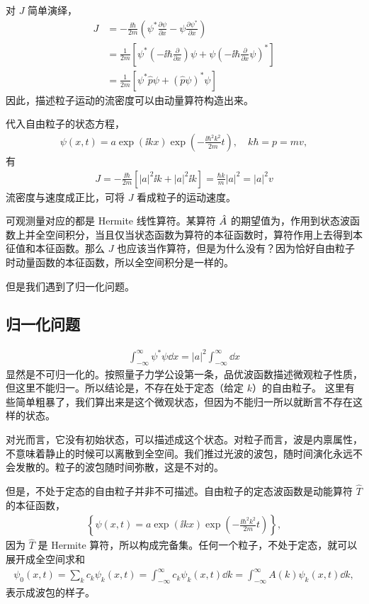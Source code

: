 对 $J$ 简单演绎，
\begin{align}
    J &= -\frac{\ii\hbar}{2m} \left( \psi^* \frac{\partial \psi}{\partial x} - \psi \frac{\partial \psi^*}{\partial x}\right) \\
    &= \frac{1}{2m} \left[
        \psi^* \left(-\ii\hbar\frac{\partial}{\partial x}\right) \psi +
        \psi \left(-\ii\hbar\frac{\partial}{\partial x} \psi\right)^*
    \right] \\
    &= \frac1{2m} \left[\psi^* \hat p \psi + (\hat p\psi)^* \psi\right]
\end{align}
因此，描述粒子运动的流密度可以由动量算符构造出来。

代入自由粒子的状态方程，
\begin{eqnarray}
    \psi(x,t) = a \exp (\ii k x) \exp \left( - \frac{\ii\hbar^2k^2}{2m}t\right), \quad k\hbar = p = mv,
\end{eqnarray}
有
\begin{eqnarray}
    J = -\frac{\ii\hbar}{2m} [|a|^2 \ii k + |a|^2 \ii k] = \frac{\hbar k} m |a|^2 = |a|^2 v
\end{eqnarray}
流密度与速度成正比，可将 $J$ 看成粒子的运动速度。

可观测量对应的都是 Hermite 线性算符。某算符 $\AA$ 的期望值为，作用到状态波函数上并全空间积分，当且仅当状态函数为算符的本征函数时，算符作用上去得到本征值和本征函数。那么 $J$ 也应该当作算符，但是为什么没有？因为恰好自由粒子时动量函数的本征函数，所以全空间积分是一样的。

但是我们遇到了归一化问题。

\subsection{归一化问题}
\begin{eqnarray}
    \int_{-\infty}^\infty \psi^*\psi \dd x = |a|^2 \int_{-\infty}^\infty \dd x
\end{eqnarray}
显然是不可归一化的。按照量子力学公设第一条，品优波函数描述微观粒子性质，但这里不能归一。所以结论是，不存在处于定态（给定 $k$）的自由粒子。
这里有些简单粗暴了，我们算出来是这个微观状态，但因为不能归一所以就断言不存在这样的状态。

对光而言，它没有初始状态，可以描述成这个状态。对粒子而言，波是内禀属性，不意味着静止的时候可以离散到全空间。我们推过光波的波包，随时间演化永远不会发散的。粒子的波包随时间弥散，这是不对的。

但是，不处于定态的自由粒子并非不可描述。自由粒子的定态波函数是动能算符 $\hat T$ 的本征函数，
\begin{eqnarray}
    \left\{\psi(x,t) = a \exp (\ii k x) \exp \left( - \frac{\ii\hbar^2k^2}{2m}t\right)
    \right\},
\end{eqnarray}
因为 $\hat T$ 是 Hermite 算符，所以构成完备集。任何一个粒子，不处于定态，就可以展开成全空间求和
\begin{eqnarray}
    \psi_0 (x,t) = \sum_k c_k\psi_k(x,t) = \int_{-\infty}^\infty c_k\psi_k (x,t) \dd k = \int_{-\infty}^\infty A(k) \psi_k(x,t) \dd k, \label{eq:wave_expand_fullSet}
\end{eqnarray}
表示成波包的样子。

